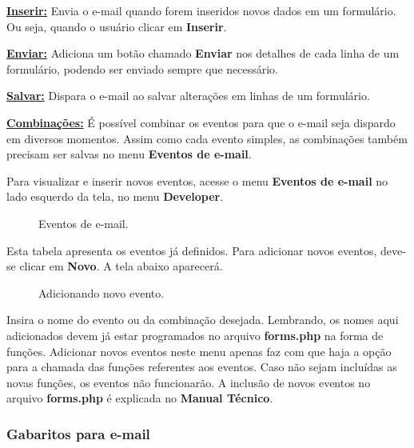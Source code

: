 \documentclass[9pt]{report}
\begin{document}
{      \underline{\textbf{Inserir:}} Envia o e-mail quando forem
      inseridos novos dados em um formulário. Ou seja, quando o
      usuário clicar em \textbf{Inserir}.
      
      \underline{\textbf{Enviar:}} Adiciona um botão chamado
      \textbf{Enviar} nos detalhes de cada linha de um formulário,
      podendo ser enviado sempre que necessário.
      
      \underline{\textbf{Salvar:}} Dispara o e-mail ao salvar
      alterações em linhas de um formulário.

      \underline{\textbf{Combinações:}} É possível combinar os
      eventos para que o e-mail seja dispardo em diversos momentos.
      Assim como cada evento simples, as combinações também precisam
      ser salvas no menu \textbf{Eventos de e-mail}.

      Para visualizar e inserir novos eventos, acesse o menu
      \textbf{Eventos de e-mail} no lado esquerdo da tela, no menu
      \textbf{Developer}.

      \begin{figure}[H]
        \caption{Eventos de e-mail.}
        \label{fig:eventosemail}
      \end{figure}

      Esta tabela apresenta os eventos já definidos. Para adicionar
      novos eventos, deve-se clicar em \textbf{Novo}. A tela abaixo
      aparecerá.

      \begin{figure}[H]
        \caption{Adicionando novo evento.}
        \label{fig:novoeventosemail}
      \end{figure}

      Insira o nome do evento ou da combinação desejada. Lembrando,
      os nomes aqui adicionados devem já estar programados no arquivo
      \textbf{forms.php} na forma de funções. Adicionar novos eventos
      neste menu apenas faz com que haja a opção para a chamada das
      funções referentes aos eventos. Caso não sejam incluídas as
      novas funções, os eventos não funcionarão. A inclusão de novos
      eventos no arquivo \textbf{forms.php} é explicada no
      \textbf{Manual Técnico}.

      \subsubsection{Gabaritos para e-mail}

}
\end{document}
